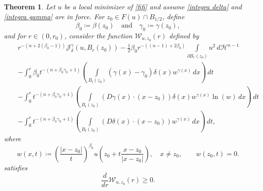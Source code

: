\documentclass[reqno,11pt]{amsart}
\newtheorem{theorem}{Theorem}[section]
\newcommand{\1}{\mathds{1}}
\numberwithin{equation}{section}
\begin{document}
\begin{theorem}\label{monotonicity formula}
Let $u$ be a local minimizer of \eqref{fifi} and assume \eqref{integra delta} and \eqref{integra gamma} are in force. For $z_0 \in F(u)\cap B_{1/2}$, define
$$
	\beta_0 \coloneqq \beta(z_0) \quad \text{and} \quad \gamma_0 \coloneqq \gamma(z_0),
$$
and for $r \in (0,r_0)$, consider the function $\mathcal{W}_{u,z_0}(r)$ defined by
\begin{eqnarray*}
  &   &  r^{-(n + 2(\beta_0-1))}\mathcal{J}_\delta^\gamma(u,B_r(z_0)) - \frac{1}{2}\beta_0 r^{-((n-1) + 2\beta_0)}\int\limits_{\partial B_r(z_0)}u^2\, d\mathcal{H}^{n-1}\\
&  & - \int_{0}^{r} \beta_0 t^{-(n+\beta_0 \gamma_0 +1)}\left(\int\limits_{B_t(z_0)}(\gamma(x)-\gamma_0)\delta(x)w^{\gamma(x)} \, dx\right)\, dt \\
&  & - \int_{0}^{r} t^{-(n+\beta_0 \gamma_0 + 1)}\left(\int\limits_{B_t(z_0)}\left(D\gamma(x)\cdot (x-z_0)\right) \delta(x) w^{\gamma(x)}  \ln(w) \, dx\right)\, dt\\
&  & -  \int_{0}^r t^{-(n+\beta_0 \gamma_0 + 1)} \left(\int\limits_{B_t(z_0)} (D\delta(x) \cdot (x - z_0)) w^{\gamma(x)}  \, dx\right)\,dt,
\end{eqnarray*}
where
$$
    w(x,t) \coloneqq \left(\frac{|x-z_0|}{t}\right)^{\beta_0} u\!\left(z_0 + t\frac{x-z_0}{|x-z_0|}\right),\quad x\ne z_0,\qquad w(z_0,t)=0.
$$
satisfies
$$
    \frac{d}{dr}\mathcal{W}_{u,z_0}(r) \geq 0.
$$
\end{theorem}
\end{document}
